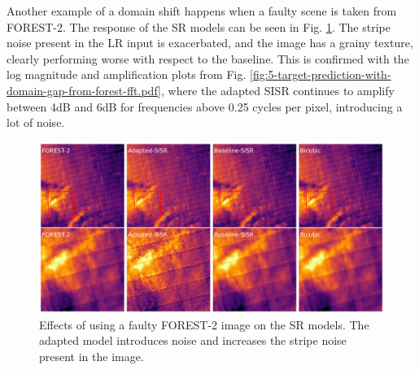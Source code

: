     Another example of a domain shift happens when a faulty scene is taken from FOREST-2. The response of the SR models can be seen in Fig. \ref{fig:target-prediction-with-domain-gap-from-forest-.pdf}. The stripe noise present in the LR input is exacerbated, and the image has a grainy texture, clearly performing worse with respect to the baseline. This is confirmed with the log magnitude and amplification plots from Fig. \ref{fig:5-target-prediction-with-domain-gap-from-forest-fft.pdf}, where the adapted SISR continues to amplify between 4dB and 6dB for frequencies above 0.25 cycles per pixel, introducing a lot of noise.


     \begin{figure}[H]
        \centering
        \includegraphics[width=\textwidth]{Includes/5-target-prediction-with-domain-gap-from-forest-.pdf}
        \caption{\small{ Effects of using a faulty FOREST-2 image on the SR models. The adapted model introduces noise and increases the stripe noise present in the image.}}
        \label{fig:target-prediction-with-domain-gap-from-forest-.pdf}
    \end{figure}

